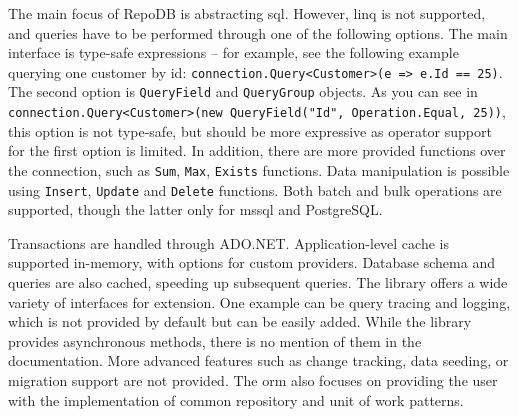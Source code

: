 The main focus of RepoDB is abstracting \acrshort{sql}. However, \acrshort{linq} is not supported, and queries have to be performed through one of the following options. The main interface is type-safe expressions -- for example, see the following example querying one customer by id: \lstinline{connection.Query<Customer>(e => e.Id == 25)}. The second option is \texttt{QueryField} and \texttt{QueryGroup} objects. As you can see in \lstinline{connection.Query<Customer>(new QueryField("Id", Operation.Equal, 25))}, this option is not type-safe, but should be more expressive as operator support for the first option is limited. In addition, there are more provided functions over the connection, such as \texttt{Sum}, \texttt{Max}, \texttt{Exists} functions. Data manipulation is possible using \texttt{Insert}, \texttt{Update} and \texttt{Delete} functions. Both batch and bulk operations are supported, though the latter only for \acrshort{mssql} and PostgreSQL.

Transactions are handled through ADO.NET. Application-level cache is supported in-memory, with options for custom providers. Database schema and queries are also cached, speeding up subsequent queries. The library offers a wide variety of interfaces for extension. One example can be query tracing and logging, which is not provided by default but can be easily added. While the library provides asynchronous methods, there is no mention of them in the documentation. More advanced features such as change tracking, data seeding, or migration support are not provided. The \acrshort{orm} also focuses on providing the user with the implementation of common repository and unit of work patterns.

